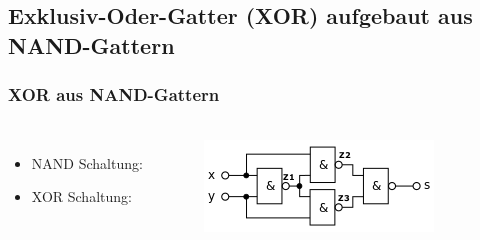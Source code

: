 \subsection{Exklusiv-Oder-Gatter (XOR) aufgebaut aus NAND-Gattern} %
\label{sub:Exklusiv-Oder-Gatter (XOR) aufgebaut aus NAND-Gattern}
\begin{frame}
    \frametitle{XOR aus NAND-Gattern}
    \framesubtitle{}
     \begin{columns}[c]
            \begin{itemize}
                \item NAND Schaltung:
                \item XOR Schaltung:
            \end{itemize}
            \begin{figure}[H]
            \begin{center}
                    \includegraphics[scale=0.7]{./img/schaltung/XOR_NAND.png}
            \end{center}
            \end{figure}
     \end{columns}
\end{frame}

